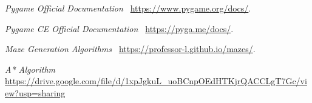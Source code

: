 \documentclass[10pt]{article}
\begin{document}
    \begin{thebibliography}{9}
        \textit{Pygame Official Documentation\ }
        \url{https://www.pygame.org/docs/}.

        \textit{Pygame CE Official Documentation\ }
        \url{https://pyga.me/docs/}.

        \textit{Maze Generation Algorithms\ }
        \url{https://professor-l.github.io/mazes/}.

        \textit{A* Algorithm\ }
        \url{https://drive.google.com/file/d/1xpJgkuL_uoBCnpOEdHTKjrQACCLgT7Gc/view?usp=sharing}

    \end{thebibliography}
\end{document}
